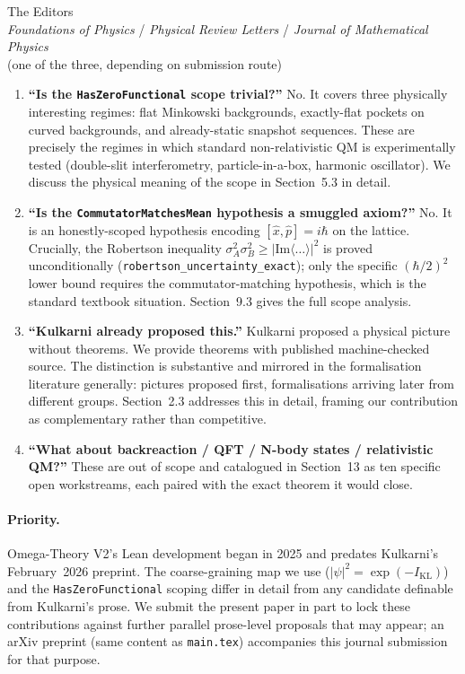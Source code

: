 \documentclass[11pt,a4paper]{letter}
\begin{document}
\begin{letter}{%
  The Editors\\
  \emph{Foundations of Physics} / \emph{Physical Review Letters} / \emph{Journal of Mathematical Physics}\\
  (one of the three, depending on submission route)}
\begin{enumerate}
\item \textbf{``Is the \texttt{HasZeroFunctional} scope trivial?''} No.
  It covers three physically interesting regimes: flat Minkowski
  backgrounds, exactly-flat pockets on curved backgrounds, and
  already-static snapshot sequences. These are precisely the regimes
  in which standard non-relativistic QM is experimentally tested
  (double-slit interferometry, particle-in-a-box, harmonic
  oscillator). We discuss the physical meaning of the scope in
  Section~5.3 in detail.

\item \textbf{``Is the \texttt{CommutatorMatchesMean} hypothesis a
  smuggled axiom?''} No. It is an honestly-scoped hypothesis
  encoding $[\hat x,\hat{p}]=i\hbar$ on the lattice. Crucially, the
  Robertson inequality
  $\sigma_{A}^{2}\sigma_{B}^{2}\ge|\mathrm{Im}\langle\ldots\rangle|^{2}$
  is proved unconditionally
  (\texttt{robertson\_uncertainty\_exact}); only the specific
  $(\hbar/2)^{2}$ lower bound requires the commutator-matching
  hypothesis, which is the standard textbook situation. Section~9.3
  gives the full scope analysis.

\item \textbf{``Kulkarni already proposed this.''} Kulkarni proposed
  a physical picture without theorems. We provide theorems with
  published machine-checked source. The distinction is substantive
  and mirrored in the formalisation literature generally: pictures
  proposed first, formalisations arriving later from different
  groups. Section~2.3 addresses this in detail, framing our
  contribution as complementary rather than competitive.

\item \textbf{``What about backreaction / QFT / N-body states /
  relativistic QM?''} These are out of scope and catalogued in
  Section~13 as ten specific open workstreams, each paired with the
  exact theorem it would close.
\end{enumerate}

\paragraph{Priority.}
Omega-Theory V2's Lean development began in 2025 and predates
Kulkarni's February~2026 preprint. The coarse-graining map we use
($|\psi|^{2}=\exp(-I_{\mathrm{KL}})$) and the \texttt{HasZeroFunctional}
scoping differ in detail from any candidate definable from Kulkarni's
prose. We submit the present paper in part to lock these contributions
against further parallel prose-level proposals that may appear; an
arXiv preprint (same content as \texttt{main.tex}) accompanies this
journal submission for that purpose.


\end{letter}
\end{document}

